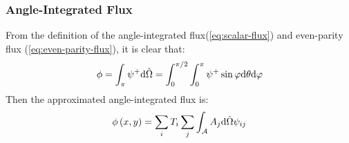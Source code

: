\begin{frame}
  \frametitle{Angle-Integrated Flux}
  From the definition of the angle-integrated flux(\cref{eq:scalar-flux}) and even-parity flux (\cref{eq:even-parity-flux}), it is clear that:
  \begin{equation}
    \phi = \int_\pi \psi^+ \dd\hat{\Omega} = \int_0^{\pi/2}\int_0^{\pi}\psi^+\sin\varphi\dd \theta\dd\varphi
  \end{equation}
  Then the approximated angle-integrated flux is:
  \begin{equation}
    \phi \left(x,y\right)=\sum_i T_i\sum_j\int_\mathcal{A}A_j \dd\hat{\Omega}\psi_{ij}
  \end{equation}
\end{frame}